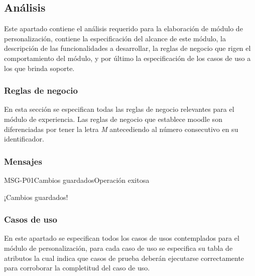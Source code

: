 
\subsection{Análisis}

 Este apartado contiene el análisis requerido para la elaboración de módulo de personalización,
 contiene la especificación del alcance de este módulo, la descripción de las funcionalidades
 a desarrollar, la reglas de negocio que rigen el comportamiento del módulo, y por último la
 especificación de los casos de uso a los que brinda soporte.



\subsubsection{Reglas de negocio} %

 En esta sección se especifican todas las reglas de negocio relevantes para el módulo de
 experiencia. Las reglas de negocio que establece moodle son diferenciadas por tener la letra {\it M}
 antecediendo al número consecutivo en su identificador.


    
\clearpage

\subsubsection{Mensajes}
  

    \begin{mensaje2}{MSG-P01}{Cambios guardados}{Operación exitosa}
        \item[Redacción:] ¡Cambios guardados!
    \end{mensaje2}
\subsubsection{Casos de uso} %

 En este apartado se especifican todos los casos de usos contemplados para el módulo de
 personalización, para cada caso de uso se especifica su tabla de atributos la cual indica que casos
 de prueba deberán ejecutarse correctamente para corroborar la completitud del caso de uso.

